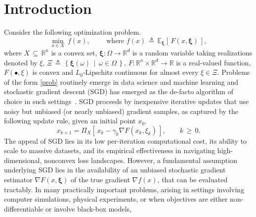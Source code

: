 \documentclass[11pt,reqno]{amsart}
\newcommand{\1}{{\bf 1}}
\newcommand{\2}{{\bf 2}}
\newcommand{\mr}[1]{{\color{blue}#1}}
\newcommand{\bxi}{\boldsymbol{\xi}}
\newcommand{\R}{\mathbb R}
\numberwithin{equation}{section}
\theoremstyle{remark}
\begin{document}
      \section{Introduction}\label{sec:intro}%
		Consider the following optimization problem. 
		\begin{equation}\label{prob}
			\min_{x \in X} \ f(x), \qquad \text{ where }  f(x)\, \triangleq \,  \mathbb{E}_{\bxi}\left[\, F(x,\bxi)\, \right] ,
		\end{equation}  
		where $X \, \subseteq \, \mathbb{R}^n$ is a convex set, $\bxi: \Omega
		\to \mathbb{R}^d$ is a random variable taking realizations denoted by $\xi$,
		$\Xi \, \triangleq \, \left\{ \bxi(\omega) \, \mid \, \omega \in \Omega
		\,\right\}$,  $F: \mathbb{R}^n \times \mathbb{R}^d \to \mathbb{R}$ is a
		real-valued function, $F(\bullet,\xi)$ is convex and $L_0$-Lipschitz continuous
		for almost every $\xi \in \Xi$. Problems of the form \eqref{prob} routinely emerge in data science and machine learning and stochastic gradient descent (SGD) has emerged as the de-facto algorithm of choice in such settings~\cite{RobbinsMonro1951,Bottou2018}. 
		SGD proceeds by inexpensive iterative updates that use noisy but unbiased (or nearly unbiased) gradient samples, as captured by the following update rule, given an initial point $x_0$.
		$$x_{k+1} =  \Pi_X \left[\, x_k - \gamma_k \nabla F(x_k,\xi_k) \, \right], \qquad k \, \ge \, 0.$$
		The appeal of SGD lies in its low per-iteration computational cost, its ability to scale to massive datasets, and its empirical effectiveness in navigating high-dimensional, nonconvex loss landscapes. However, a fundamental assumption underlying SGD 
		lies in the availability of  {an unbiased stochastic gradient estimator} $\nabla F(x, \bxi)$ {of the true gradient $\nabla f(x)$}, 
		that can be evaluated tractably. 
		In many practically important problems, arising in 
		settings involving computer simulations, physical experiments, or when objectives are either non-differentiable or involve black-box models,
\end{document}
